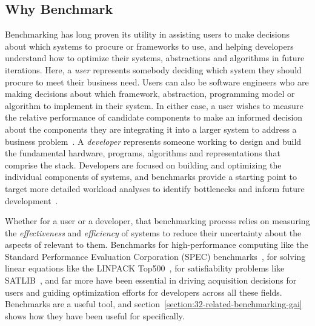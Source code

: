 \subsection{Why Benchmark}

Benchmarking has long proven its utility in assisting users to make decisions about which systems to procure or frameworks to use, and helping developers understand how to optimize their systems, abstractions and algorithms in future iterations. 
Here, a \textit{user} represents somebody deciding which system they should procure to meet their business need. 
Users can also be software engineers who are making decisions about which framework, abstraction, programming model or algorithm to implement in their system. 
In either case, a user wishes to measure the relative performance of candidate components to make an informed decision about the \gai components they are integrating it into a larger system to address a business problem~\cite{Carpinetti2002}.
A \textit{developer} represents someone working to design and build the fundamental hardware, programs, algorithms and representations that comprise the \gai stack. 
Developers are focused on building and optimizing the individual components of \gai systems, and benchmarks provide a starting point to target more detailed workload analyses to identify bottlenecks and inform future development~\cite{Saavedra1996, Hooker1994, Hooker1995}. 

Whether for a user or a developer, that benchmarking process relies on measuring the \textit{effectiveness} and \textit{efficiency} of systems to reduce their uncertainty about the aspects of \gai relevant to them.
Benchmarks for high-performance computing like the Standard Performance Evaluation Corporation (SPEC) benchmarks~\cite{Hennessy2019}, for solving linear equations like the LINPACK Top500~\cite{Dongarra2003}, for satisfiability problems like SATLIB~\cite{Hoos2000}, and far more have been essential in driving acquisition decisions for users and guiding optimization efforts for developers across all these fields. 
Benchmarks are a useful tool, and section~\ref{section:32-related-benchmarking-gai} shows how they have been useful for \gai specifically.

